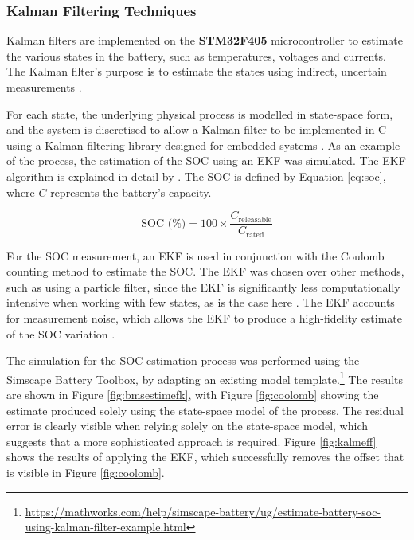 \subsubsection{Kalman Filtering Techniques}
\label{kalm}

Kalman filters are implemented on the \textbf{STM32F405} microcontroller to estimate the various states in the battery, such as temperatures, voltages and currents. The Kalman filter's purpose is to estimate the states using indirect, uncertain measurements \cite{kalfilt}. 

For each state, the underlying physical process is modelled in state-space form, and the system is discretised to allow a Kalman filter to be implemented in C using a Kalman filtering library designed for embedded systems \cite{computers11110165}. As an example of the process, the estimation of the \gls{SOC} using an \gls{EKF} was simulated. The \gls{EKF} algorithm is explained in detail by \cite{kalfilt}.  The \gls{SOC} is defined by Equation \ref{eq:soc}, where $C$ represents the battery's capacity.

\begin{equation}
\label{eq:soc}
\text{SOC (\%)} = 100 \times \frac{C_{\text{releasable}}}{C_{\text{rated}}}
\end{equation}

For the \gls{SOC} measurement, an \gls{EKF} is used in conjunction with the Coulomb counting method to estimate the \gls{SOC}. The \gls{EKF} was chosen over other methods, such as using a particle filter, since the \gls{EKF} is significantly less computationally intensive when working with few states, as is the case here \cite{STELZER20171483}. The \gls{EKF} accounts for measurement noise, which allows the \gls{EKF} to produce a high-fidelity estimate of the \gls{SOC} variation \cite{Zaki2025}.

 The simulation for the \gls{SOC} estimation process was performed using the Simscape Battery Toolbox, by adapting an existing model template.\footnote{\url{https://mathworks.com/help/simscape-battery/ug/estimate-battery-soc-using-kalman-filter-example.html}} The results are shown in Figure \ref{fig:bmsestimefk}, with Figure \ref{fig:coolomb} showing the estimate produced solely using the state-space model of the process. The residual error is clearly visible when relying solely on the state-space model, which suggests that a more sophisticated approach is required. Figure \ref{fig:kalmeff} shows the results of applying the \gls{EKF}, which successfully removes the offset that is visible in Figure \ref{fig:coolomb}.


